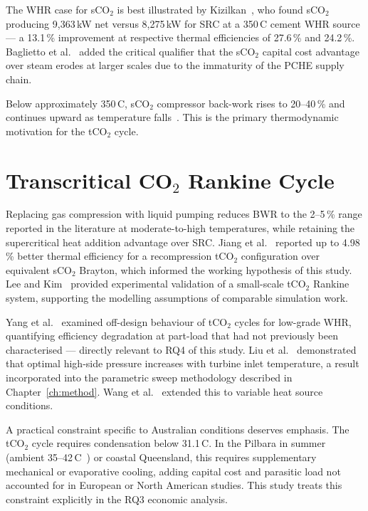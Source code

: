 \documentclass[12pt,a4paper]{report}
\begin{document}
The WHR case for sCO$_2$ is best illustrated by Kizilkan~\cite{Kizilkan2020},
who found sCO$_2$ producing 9,363\,kW net versus 8,275\,kW for SRC at a
350\,\textdegree C cement WHR source --- a 13.1\,\% improvement at respective
thermal efficiencies of 27.6\,\% and 24.2\,\%. Baglietto et
al.~\cite{Baglietto2023} added the critical qualifier that the sCO$_2$ capital
cost advantage over steam erodes at larger scales due to the immaturity of
the PCHE supply chain.

Below approximately 350\,\textdegree C, sCO$_2$ compressor back-work rises
to 20--40\,\% and continues upward as temperature falls~\cite{Crespi2017}.
This is the primary thermodynamic motivation for the tCO$_2$ cycle.

\section{Transcritical CO$_2$ Rankine Cycle}
\label{sec:lit_tco2}

Replacing gas compression with liquid pumping reduces BWR to the 2--5\,\%
range reported in the literature at moderate-to-high temperatures, while
retaining the supercritical heat addition advantage over SRC. Jiang et
al.~\cite{Jiang2023} reported up to 4.98\,\% better thermal efficiency for a
recompression tCO$_2$ configuration over equivalent sCO$_2$ Brayton, which
informed the working hypothesis of this study. Lee and
Kim~\cite{Lee2023} provided experimental validation of a small-scale tCO$_2$
Rankine system, supporting the modelling assumptions of comparable simulation
work.

Yang et al.~\cite{Yang2024} examined off-design behaviour of tCO$_2$ cycles
for low-grade WHR, quantifying efficiency degradation at part-load that had
not previously been characterised --- directly relevant to RQ4 of this study.
Liu et al.~\cite{Liu2024} demonstrated that optimal high-side pressure
increases with turbine inlet temperature, a result incorporated into the
parametric sweep methodology described in Chapter~\ref{ch:method}. Wang et
al.~\cite{Wang2025} extended this to variable heat source conditions.

A practical constraint specific to Australian conditions deserves emphasis.
The tCO$_2$ cycle requires condensation below 31.1\,\textdegree C. In the
Pilbara in summer (ambient 35--42\,\textdegree C~\cite{BOM2024}) or coastal
Queensland, this requires supplementary mechanical or evaporative cooling,
adding capital cost and parasitic load not accounted for in European or
North American studies. This study treats this constraint explicitly in the
RQ3 economic analysis.
\end{document}
